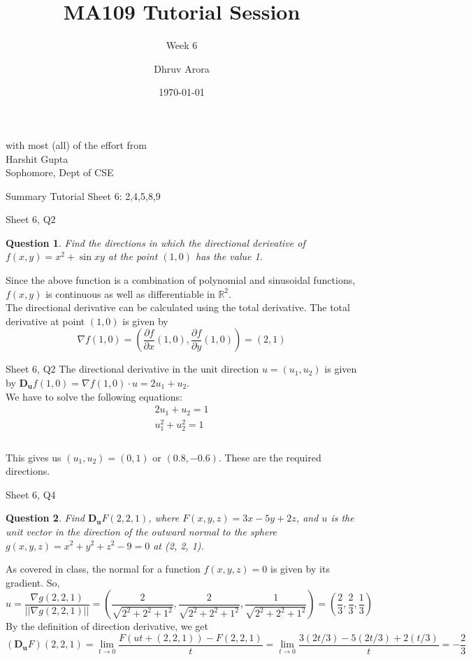 \documentclass[aspectratio=169]{beamer}
\title{MA109 Tutorial Session}
\subtitle{Week 6}
\author{Dhruv Arora}
\institute{Sophomore, Dept of CSE}
\date{\today}
\newtheorem{qsn}{Question}
\begin{document}
\begin{frame}
	\titlepage
	\begin{center}
	{\tiny with most (all) of the effort from}\\
	{\small Harshit Gupta}\\
	{\tiny Sophomore, Dept of CSE}
	\end{center}
\end{frame}

\begin{frame}{Summary} 
Tutorial Sheet 6:  2,4,5,8,9
\end{frame}

\begin{frame}{Sheet 6, Q2}
	\begin{qsn}
        Find the directions in which the directional derivative of $f(x, y) = x^2 + \sin xy$ at the point
        $(1, 0)$ has the value 1.
	\end{qsn}
	\pause
	Since the above function is a combination of polynomial and sinusoidal functions, $f(x,y)$ is continuous as well as differentiable in $\mathbb{R}^2$.\\
	\pause
	The directional derivative can be calculated using the total derivative. The total derivative at point $(1,0)$ is given by
	$$
	    \nabla f(1,0)  = \left( \frac{\partial f}{\partial x}(1,0) , \frac{\partial f}{\partial y} (1,0)\right) = \left( 2, 1\right)
	$$
\end{frame}

\begin{frame}{Sheet 6, Q2}
	The directional derivative in the unit direction $u = (u_1,u_2)$ is given by $\mathbf{D_u}f(1,0) =  \nabla f(1,0) \cdot u = 2u_1 + u_2$.\\
	\pause
	We have to solve the following equations: 
	\begin{align*}
	2u_1 + u_2 = 1\\
	 u_1^2 + u_2^2 = 1\\
	\end{align*}
	\\\vspace{-20pt}
	\pause
	This gives us $(u_1, u_2) = (0,1)$ or $(0.8,-0.6)$. These are the required directions. 
\end{frame}
\begin{frame}{Sheet 6, Q4}
	\begin{qsn}
    Find $\mathbf{D_u}F(2, 2, 1)$, where $F(x, y, z) = 3x - 5y + 2z$, and $u$ is the unit vector in the direction of the outward normal to the sphere $g(x,y,z) = x^2 + y^2 + z^2 - 9 = 0$ at (2, 2, 1).
    \end{qsn}
     {
    As covered in class, the normal for a function $f(x,y,z)=0$ is given by its gradient. So, 
    $$
        u = \frac{\nabla g(2,2,1)}{||\nabla g(2,2,1)||} = \left(\frac{2}{\sqrt{2^2+2^2+1^2}},\frac{2}{\sqrt{2^2+2^2+1^2}},\frac{1}{\sqrt{2^2+2^2+1^2}}\right) = \left(\frac{2}{3},\frac{2}{3},\frac{1}{3}\right)
    $$
	}
     {
    By the definition of direction derivative, we get
    $$
    (\mathbf{D_u}F)(2, 2, 1) =  \lim_{t\to 0} \frac{F(ut+(2,2,1)) - F(2,2,1)}{t} = \lim_{t\to 0}\frac{3(2t/3) - 5(2t/3) + 2(t/3)}{t} = -\frac{2}{3}
    $$
	}
\end{frame}
\end{document}
